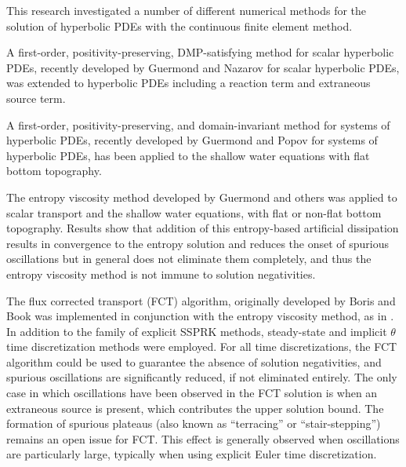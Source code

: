 This research investigated a number of different numerical methods for
the solution of hyperbolic PDEs with the continuous finite element
method.

A first-order, positivity-preserving, DMP-satisfying method
for scalar hyperbolic PDEs, recently developed by Guermond and Nazarov
\cite{guermond_firstorder} for scalar hyperbolic PDEs, was extended
to hyperbolic PDEs including a reaction term and extraneous source term.

A first-order, positivity-preserving, and domain-invariant method for systems
of hyperbolic PDEs, recently developed by Guermond and Popov
\cite{guermond_invariantdomain} for systems of hyperbolic PDEs,
has been applied to the shallow water equations with flat bottom topography.

The entropy viscosity method developed by Guermond and others \cite{guermond_ev}
was applied to scalar transport and the shallow water equations, with flat
or non-flat bottom topography. Results show that addition of this entropy-based
artificial dissipation results in convergence to the entropy solution
and reduces the onset of spurious oscillations but in general does not eliminate
them completely, and thus the entropy viscosity method is not immune to
solution negativities.

The flux corrected transport (FCT) algorithm, originally developed by Boris
and Book \cite{borisbook} was implemented in conjunction with the entropy
viscosity method, as in \cite{guermond_secondorder}. In addition to the
family of explicit SSPRK methods, steady-state and implicit $\theta$
time discretization methods were employed. For all time discretizations,
the FCT algorithm could be used to guarantee the absence of solution
negativities, and spurious oscillations are significantly reduced, if
not eliminated entirely. The only case in which oscillations have been
observed in the FCT solution is when an extraneous source is present, which
contributes the upper solution bound. 
The formation of spurious plateaus (also known as ``terracing'' or
``stair-stepping'') remains an open issue for FCT. This effect is generally
observed when oscillations are particularly large, typically when using
explicit Euler time discretization.

